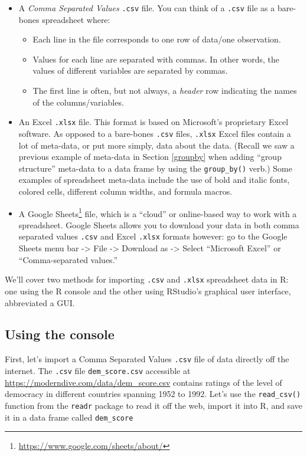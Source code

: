 \documentclass[12pt, krantz2,]{krantz}
\providecommand{\tightlist}{%
  \setlength{\itemsep}{0pt}\setlength{\parskip}{0pt}}
\renewcommand{\href}[2]{#2\footnote{\url{#1}}}
\begin{document}
\begin{itemize}
\tightlist
\item
  A \emph{Comma Separated Values} \texttt{.csv} file. You can think of a \texttt{.csv} file as a bare-bones spreadsheet where:

  \begin{itemize}
  \tightlist
  \item
    Each line in the file corresponds to one row of data/one observation.
  \item
    Values for each line are separated with commas. In other words, the values of different variables are separated by commas.
  \item
    The first line is often, but not always, a \emph{header} row indicating the names of the columns/variables.
  \end{itemize}
\item
  An Excel \texttt{.xlsx} file. This format is based on Microsoft's proprietary Excel software. As opposed to a bare-bones \texttt{.csv} files, \texttt{.xlsx} Excel files contain a lot of meta-data, or put more simply, data about the data. (Recall we saw a previous example of meta-data in Section \ref{groupby} when adding ``group structure'' meta-data to a data frame by using the \texttt{group\_by()} verb.) Some examples of spreadsheet meta-data include the use of bold and italic fonts, colored cells, different column widths, and formula macros.
\item
  A \href{https://www.google.com/sheets/about/}{Google Sheets} file, which is a ``cloud'' or online-based way to work with a spreadsheet. Google Sheets allows you to download your data in both comma separated values \texttt{.csv} and Excel \texttt{.xlsx} formats however: go to the Google Sheets menu bar -\textgreater{} File -\textgreater{} Download as -\textgreater{} Select ``Microsoft Excel'' or ``Comma-separated values.''
\end{itemize}

We'll cover two methods for importing \texttt{.csv} and \texttt{.xlsx} spreadsheet data in R: one using the R console and the other using RStudio's graphical user interface, abbreviated a GUI.

\hypertarget{using-the-console}{%
\subsection{Using the console}\label{using-the-console}}

First, let's import a Comma Separated Values \texttt{.csv} file of data directly off the internet. The \texttt{.csv} file \texttt{dem\_score.csv} accessible at \url{https://moderndive.com/data/dem_score.csv} contains ratings of the level of democracy in different countries spanning 1952 to 1992. Let's use the \texttt{read\_csv()} function from the \texttt{readr} package to read it off the web, import it into R, and save it in a data frame called \texttt{dem\_score}
\end{document}
